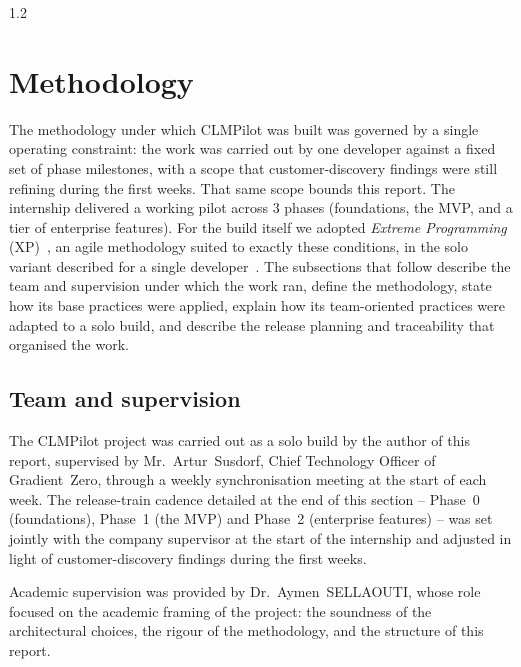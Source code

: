\begin{spacing}{1.2}
\section{Methodology}
\label{sec:methodology}

The methodology under which CLMPilot was built was governed by a single
operating constraint: the work was carried out by one developer against
a fixed set of phase milestones, with a scope that customer-discovery
findings were still refining during the first weeks. That same scope
bounds this report. The internship delivered a working
pilot across 3 phases (foundations, the MVP, and a tier of
enterprise features). For the
build itself we adopted \textit{Extreme Programming}
(XP)~\cite{Beck2004}, an agile methodology suited to exactly these
conditions, in the solo variant described for a single
developer~\cite{C2XPForOne}. The subsections that follow describe the
team and supervision under which the work ran, define the
methodology, state how its base practices were applied, explain how its
team-oriented practices were adapted to a solo build, and describe the
release planning and traceability that organised the work.

\subsection{Team and supervision}
The CLMPilot project was carried out as a solo build by the author of this
report, supervised by Mr.~Artur~Susdorf, Chief Technology Officer of
Gradient~Zero, through a weekly synchronisation meeting at the start
of each week. The release-train cadence detailed at the end of this
section -- Phase~0 (foundations), Phase~1 (the MVP)
and Phase~2 (enterprise features) -- was set jointly
with the company supervisor at the start of the internship and
adjusted in light of customer-discovery findings during the first
weeks.

Academic supervision was provided by Dr.~Aymen~SELLAOUTI, whose role
focused on the academic framing of the project: the soundness of the
architectural choices, the rigour of the methodology, and the structure of
this report.


\end{spacing}
